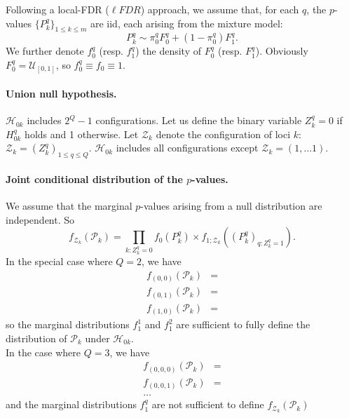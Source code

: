 \documentclass[a4paper, 11pt]{article}
\newcommand{\Hcal}{\mathcal{H}}
\newcommand{\Pcal}{\mathcal{P}}
\newcommand{\Ucal}{\mathcal{U}}
\newcommand{\Zcal}{\mathcal{Z}}
\begin{document}
Following a local-FDR ($\ell FDR$) approach, we assume that, for each $q$, the $p$-values $\{P^q_k\}_{1 \leq k \leq m}$ are iid, each arising from the mixture model:
\begin{equation} \label{eq:MixturePk}
 P^q_k \sim \pi_0^q F^q_0 + (1-\pi_0^q) F^q_1.
\end{equation}
We further denote $f^q_0$ (resp. $f^q_1$) the density of $F^q_0$ (resp. $F^q_1$). Obviously $F^q_0 = \Ucal_{[0, 1]}$, so $f^q_0 \equiv f_0 \equiv 1$.

\paragraph{Union null hypothesis.} 
$\Hcal_{0k}$ includes $2^Q -1$ configurations. Let us define the binary variable
$Z^q_k = 0$ if $H^q_{0k}$ holds and 1 otherwise. Let $\Zcal_k$ denote the configuration of loci $k$: $\Zcal_k = (Z^q_k)_{1 \leq q \leq Q}$. $\Hcal_{0k}$ includes all configurations except $\Zcal_k = (1, \dots 1)$.

\paragraph{Joint conditional distribution of the $p$-values.} We assume that the marginal $p$-values arising from a null distribution are independent. So
$$
f_{\Zcal_k}(\Pcal_k) = \prod_{k: Z^q_k=0} f_0(P^q_k) \times f_{1;\Zcal_k}\left((P^q_k)_{q: Z^q_k=1}\right).
$$
In the special case where $Q=2$, we have
\begin{align*}
  f_{(0,0)}(\Pcal_k) & = \\
  f_{(0,1)}(\Pcal_k) & = \\
  f_{(1,0)}(\Pcal_k) & = 
\end{align*}
so the marginal distributions $f^1_1$ and $f^2_1$ are sufficient to fully define the distribution of $\Pcal_k$ under $\Hcal_{0k}$. \\
In the case where $Q=3$, we have
\begin{align*}
  f_{(0,0,0)}(\Pcal_k) & = \\
  f_{(0,0,1)}(\Pcal_k) & = \\
  \dots 
\end{align*}
and the marginal distributions $f^q_1$ are not sufficient to define $f_{\Zcal_k}(\Pcal_k)$


\end{document}
